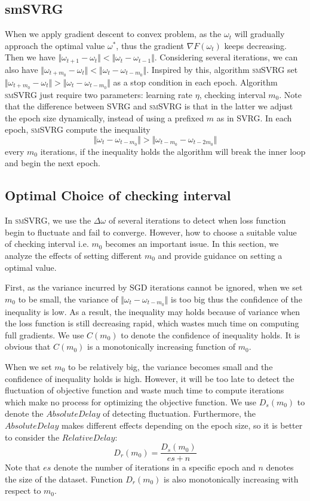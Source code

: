 \documentclass[conference]{IEEEtran}
\begin{document}
 \subsection{smSVRG}
 When we apply gradient descent to convex problem, as the $\omega_t$ will gradually approach the optimal value $\omega^*$, thus the gradient $\nabla F(\omega_t)$ keeps decreasing. Then we have $\Vert\omega_{t+1}-\omega_t\Vert<\Vert\omega_{t}-\omega_{t-1}\Vert$. Considering several iterations, we can also have $\Vert\omega_{t+m_0}-\omega_t\Vert<\Vert\omega_{t}-\omega_{t-m_0}\Vert$. Inspired by this, algorithm \textsc{smSVRG}  set $\Vert\omega_{t+m_0}-\omega_t\Vert>\Vert\omega_{t}-\omega_{t-m_0}\Vert$ as a stop condition in each epoch. 
 Algorithm \textsc{smSVRG} just require two parameters: learning rate $\eta$, checking interval $m_0$. Note that the difference between SVRG and \textsc{smSVRG} is that in the latter we adjust the epoch size dynamically, instead of using a prefixed $m$ as in SVRG. In each epoch, \textsc{smSVRG} compute the inequality $$\Vert\omega_{t}-\omega_{t-m_0}\Vert>\Vert\omega_{t-m_0}-\omega_{t-2m_0}\Vert$$ every $m_0$ iterations, if the inequality holds the algorithm will break the inner loop and begin the next epoch.
 
 \subsection{Optimal Choice of checking interval}
 \label{secOCCI}
 In \textsc{smSVRG}, we use the $\Delta\omega$ of several iterations to detect when loss function begin to fluctuate and fail to converge. However, how to choose a suitable value of checking interval i.e. $m_0$ becomes an important issue. In this section, we analyze the effects of setting different $m_0$ and provide guidance on setting a optimal value.
 
 First, as the variance incurred by SGD iterations cannot be ignored, when we set $m_0$ to be small, the variance of $\Vert\omega_{t}-\omega_{t-m_0}\Vert$ is too big thus the confidence of the inequality is low. As a result, the inequality may holds because of variance when the loss function is still decreasing rapid, which wastes much time on computing full gradients. We use $C(m_0)$ to denote the confidence of inequality holds. It is obvious that $C(m_0)$ is a monotonically increasing function of $m_0$.
 
 When we set $m_0$ to be relatively big, the variance becomes small and the confidence of inequality holds is high. However, it will be too late to detect the fluctuation of objective function and waste much time to compute iterations which make no process for optimizing the objective function. We use $D_s(m_0)$ to denote the $Absolute Delay$ of detecting fluctuation. Furthermore, the $Absolute Delay$ makes different effects depending on the epoch size, so it is better to consider the $Relative Delay$:
 $$D_r(m_0)=\frac{D_s(m_0)}{es+n}$$
 Note that $es$ denote the number of iterations in a specific epoch and $n$ denotes the size of the dataset. Function $D_r(m_0)$ is also monotonically increasing with respect to $m_0$.
\end{document}
